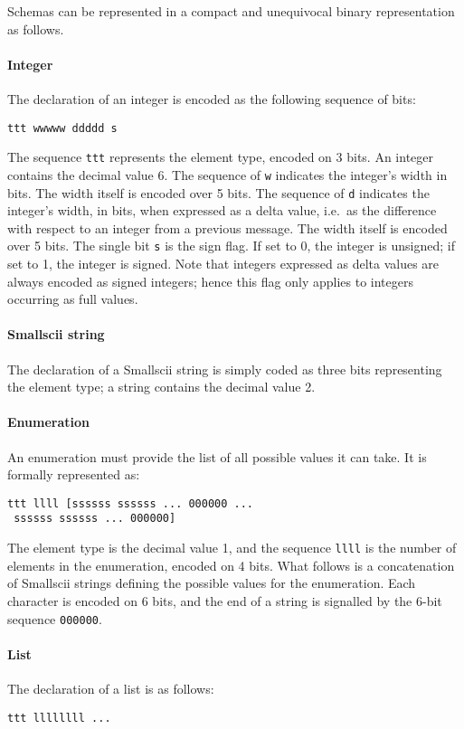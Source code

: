 Schemas can be represented in a compact and unequivocal binary representation as follows.

\paragraph{Integer} The declaration of an integer is encoded as the following sequence of bits:
%
\begin{verbatim}
ttt wwwww ddddd s
\end{verbatim}

The sequence \verb+ttt+ represents the element type, encoded on 3 bits. An integer contains the decimal value 6. The sequence of \verb+w+ indicates the integer's width in bits. The width itself is encoded over 5 bits. The sequence of \verb+d+ indicates the integer's width, in bits, when expressed as a delta value, i.e.\ as the difference with respect to an integer from a previous message. The width itself is encoded over 5 bits. The single bit \verb+s+ is the sign flag. If set to 0, the integer is unsigned; if set to 1, the integer is signed. Note that integers expressed as delta values are always encoded as signed integers; hence this flag only applies to integers occurring as full values.

\paragraph{Smallscii string} The declaration of a Smallscii string is simply coded as three bits representing the element type; a string contains the decimal value 2.

\paragraph{Enumeration} An enumeration must provide the list of all possible values it can take. It is formally represented as:
%
\begin{verbatim}
ttt llll [ssssss ssssss ... 000000 ...
 ssssss ssssss ... 000000]
\end{verbatim}

The element type is the decimal value 1, and the sequence \verb+llll+ is the number of elements in the enumeration, encoded on 4 bits. What follows is a concatenation of Smallscii strings defining the possible values for the enumeration. Each character is encoded on 6 bits, and the end of a string is signalled by the 6-bit sequence \verb+000000+.

\paragraph{List} The declaration of a list is as follows:
%
\begin{verbatim}
ttt llllllll ...
\end{verbatim}

